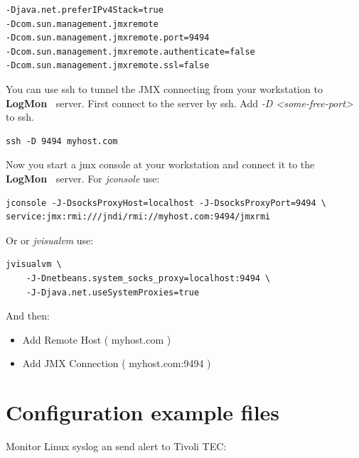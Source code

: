 \documentclass[11pt,a4paper]{article}
\newcommand{\logmon}{\textbf{LogMon\ }}
\begin{document}
\begin{verbatim}
-Djava.net.preferIPv4Stack=true
-Dcom.sun.management.jmxremote
-Dcom.sun.management.jmxremote.port=9494
-Dcom.sun.management.jmxremote.authenticate=false
-Dcom.sun.management.jmxremote.ssl=false
\end{verbatim}

You can use ssh to tunnel the JMX  connecting from your workstation to \logmon
server. First connect to the server by ssh. Add \textit{-D \textless{}some-free-port\textgreater{}  } to ssh.

\begin{verbatim}
ssh -D 9494 myhost.com
\end{verbatim}

Now you start a jmx console at your workstation and connect it to the \logmon
server. For \textit{jconsole} use:

\begin{verbatim}
jconsole -J-DsocksProxyHost=localhost -J-DsocksProxyPort=9494 \
service:jmx:rmi:///jndi/rmi://myhost.com:9494/jmxrmi
\end{verbatim}


Or or \textit{jvisualvm} use:

\begin{verbatim}
jvisualvm \
    -J-Dnetbeans.system_socks_proxy=localhost:9494 \
    -J-Djava.net.useSystemProxies=true
\end{verbatim}

And then:

\begin{itemize}
  \item Add Remote Host ( myhost.com )
  \item Add JMX Connection ( myhost.com:9494 )
\end{itemize}

\appendix

\section{Configuration example files}
\label{sec:confex}

Monitor Linux syslog an send alert to Tivoli TEC:
\end{document}
